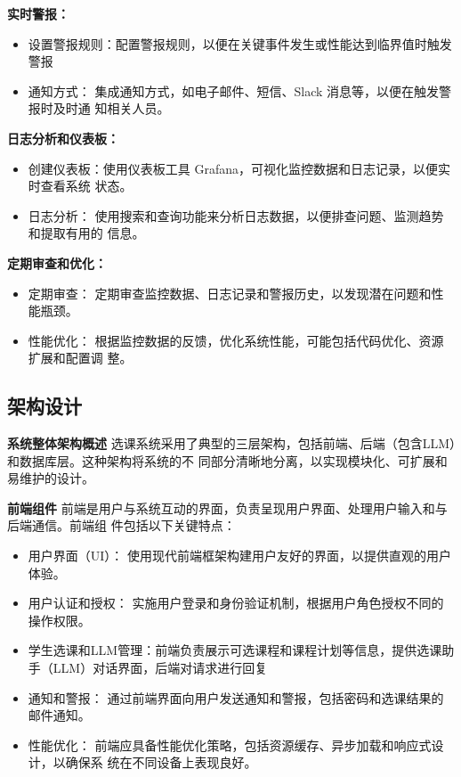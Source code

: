 \documentclass{article}
\begin{document}
\textbf{实时警报：}
\begin{itemize}
	\item 设置警报规则：配置警报规则，以便在关键事件发生或性能达到临界值时触发警报
	\item 通知方式： 集成通知方式，如电子邮件、短信、Slack 消息等，以便在触发警报时及时通
	知相关人员。
\end{itemize}

\textbf{日志分析和仪表板：}
\begin{itemize}
	\item 创建仪表板：使用仪表板工具 Grafana，可视化监控数据和日志记录，以便实时查看系统
	状态。
	\item 日志分析： 使用搜索和查询功能来分析日志数据，以便排查问题、监测趋势和提取有用的
	信息。
\end{itemize}

\textbf{定期审查和优化：}
\begin{itemize}
	\item 定期审查： 定期审查监控数据、日志记录和警报历史，以发现潜在问题和性能瓶颈。
	\item 性能优化： 根据监控数据的反馈，优化系统性能，可能包括代码优化、资源扩展和配置调
	整。
\end{itemize}


\subsection{架构设计}
\textbf{系统整体架构概述}
选课系统采用了典型的三层架构，包括前端、后端（包含LLM）和数据库层。这种架构将系统的不
同部分清晰地分离，以实现模块化、可扩展和易维护的设计。


\textbf{前端组件}
前端是用户与系统互动的界面，负责呈现用户界面、处理用户输入和与后端通信。前端组
件包括以下关键特点：
\begin{itemize}
	\item 用户界面（UI）： 使用现代前端框架构建用户友好的界面，以提供直观的用户体验。
	\item 用户认证和授权： 实施用户登录和身份验证机制，根据用户角色授权不同的操作权限。
	\item 学生选课和LLM管理：前端负责展示可选课程和课程计划等信息，提供选课助手（LLM）对话界面，后端对请求进行回复
	\item 通知和警报： 通过前端界面向用户发送通知和警报，包括密码和选课结果的邮件通知。
	\item 性能优化： 前端应具备性能优化策略，包括资源缓存、异步加载和响应式设计，以确保系
	统在不同设备上表现良好。
\end{itemize}
\end{document}
